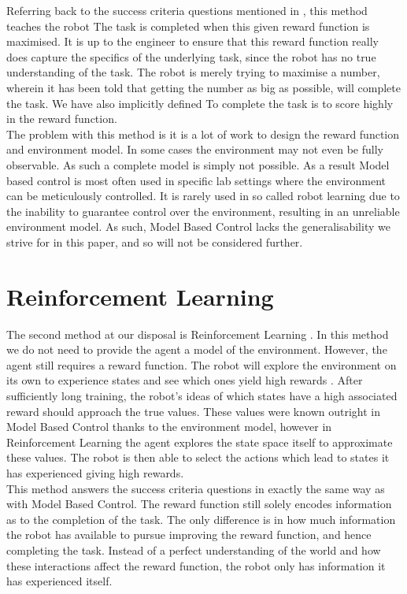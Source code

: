Referring back to the success criteria questions mentioned in , this method teaches the robot  The task is completed when this given reward function is maximised. It is up to the engineer to ensure that this reward function really does capture the specifics of the underlying task, since the robot has no true understanding of the task. The robot is merely trying to maximise a number, wherein it has been told that getting the number as big as possible, will complete the task. We have also implicitly defined  To complete the task is to score highly in the reward function.\\

The problem with this method is it is a lot of work to design the reward function and environment model. In some cases the environment may not even be fully observable. As such a complete model is simply not possible. As a result Model based control is most often used in specific lab settings where the environment can be meticulously controlled. It is rarely used in so called  robot learning due to the inability to guarantee control over the environment, resulting in an unreliable environment model. As such, Model Based Control lacks the generalisability we strive for in this paper, and so will not be considered further.

\section{Reinforcement Learning}
\label{sec:reinforcement-learning}
The second method at our disposal is Reinforcement Learning \cite{rl}. In this method we do not need to provide the agent a model of the environment. However, the agent still requires a reward function. The robot will explore the environment on its own to experience states and see which ones yield high rewards \cite{rl-intro-book, rl-book}. After sufficiently long training, the robot's ideas of which states have a high associated reward should approach the true values. These values were known outright in Model Based Control thanks to the environment model, however in Reinforcement Learning the agent explores the state space itself to approximate these values. The robot is then able to select the actions which lead to states it has experienced giving high rewards.\\

This method answers the success criteria questions in exactly the same way as with Model Based Control. The reward function still solely encodes information as to the completion of the task. The only difference is in how much information the robot has available to pursue improving the reward function, and hence completing the task. Instead of a perfect understanding of the world and how these interactions affect the reward function, the robot only has information it has experienced itself.\\

